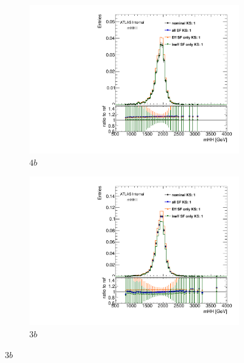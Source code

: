 \begin{figure}[htb!]
\centering
\captionsetup{justification=centering}
    \begin{subfigure}[b]{0.45\textwidth}
        \includegraphics[width=\textwidth,angle=-90]{figures/boosted/AppendixbSF/directcompare_mHH_l_bSF_2000_FT_EFF_Eigen_B_0__1down_FourTag_.pdf}
        \caption{$4b$}
        \label{fig:signal_bsyst_reduction-4b}
    \end{subfigure}
    \quad 
    \begin{subfigure}[b]{0.45\textwidth}
        \includegraphics[width=\textwidth,angle=-90]{figures/boosted/AppendixbSF/directcompare_mHH_l_bSF_2000_FT_EFF_Eigen_B_0__1down_ThreeTag_.pdf}
        \caption{$3b$}
        \label{fig:signal_bsyst_reduction-3b}
    \end{subfigure}

\end{figure}
